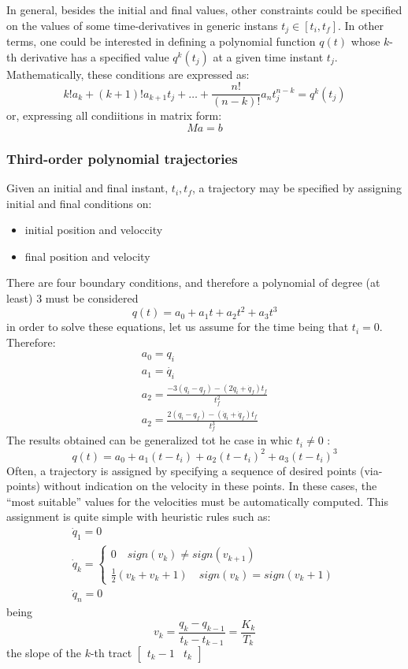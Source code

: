 \documentclass{book}
\begin{document}
In general, besides the initial and final values, other constraints could be specified on the values of some time-derivatives in generic instans $t_j\in[t_i,t_f]$. In other terms, one could be interested in defining a polynomial function $q(t)$ whose $k$-th derivative has a specified value $q^k(t_j)$ at a given time instant $t_j$. Mathematically, these conditions are expressed as: 
\[
    k!a_k+(k+1)!a_{k+1}t_j+\dots+\displaystyle\frac{n!}{(n-k)!}a_nt_j^{n-k}=q^k(t_j)
\]
or, expressing all condiitions in matrix form: 
\[
    Ma=b
\]

\subsubsection{Third-order polynomial trajectories}
Given an initial and final instant, $t_i,t_f$, a trajectory may be specified by assigning initial and final conditions on: 
\begin{itemize}
    \item initial position and veloccity 
        \item final position and velocity 
\end{itemize}
There are four boundary conditions, and therefore a polynomial of degree (at least) 3 must be considered
\[
    q(t)=a_0+a_1t+a_2t^2+a_3t^3
\]
in order to solve these equations, let us assume for the time being that $t_i=0$. Therefore: 
\begin{gather*}
    a_0=q_i \\
    a_1  = \dot{q_i}\\
    a_2 = \displaystyle\frac{-3(q_i-q_f)-(2\dot{q}_i+\dot{q}_f)t_f}{t_f^2}\\
    a_2 = \displaystyle\frac{2(q_i-q_f)-(\dot{q}_i+\dot{q}_f)t_f}{t_f^3}
\end{gather*}
The results obtained can be generalized tot he case in whic $t_i\neq0$ :
\[
    q(t)=a_0+a_1(t-t_i)+a_2(t-t_i)^2+a_3(t-t_i)^3
\]
Often, a trajectory is assigned by specifying a sequence of desired points (via-points)
without indication on the velocity in these points.
In these cases, the “most suitable” values for the velocities must be automatically
computed.
This assignment is quite simple with heuristic rules such as:
\begin{gather*}
    \dot{q}_1 = 0\\
    \dot{q}_k= \begin{cases}
        0 \quad sign(v_k)\neq sign(v_{k+1})\\
        \displaystyle\frac{1}{2}(v_k+v_k+1) \quad sign(v_k)=sign(v_k+1)
    \end{cases}\\
    \dot{q}_n=0
\end{gather*}
being 
\[
    v_k = \displaystyle\frac{q_k-q_{k-1}}{t_k-t_{k-1}}=\displaystyle\frac{K_k}{T_k}
\]
the slope of the $k$-th tract $\begin{bmatrix}
    t_k-1 & t_k
\end{bmatrix}$
\end{document}
